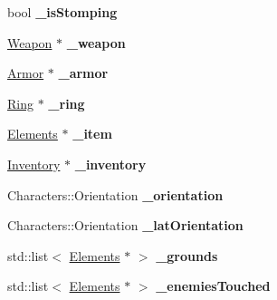 \begin{DoxyCompactItemize}
\item 
\hypertarget{class_characters_a96f1a899be7360999fea95c6d2e81db1}{bool {\bfseries \+\_\+is\+Stomping}}\label{class_characters_a96f1a899be7360999fea95c6d2e81db1}

\item 
\hypertarget{class_characters_aee5f545db9a5e0ee19af66dc0754b602}{\hyperlink{class_weapon}{Weapon} $\ast$ {\bfseries \+\_\+weapon}}\label{class_characters_aee5f545db9a5e0ee19af66dc0754b602}

\item 
\hypertarget{class_characters_a7a40cec6ae954c9b10bc30dcef299008}{\hyperlink{class_armor}{Armor} $\ast$ {\bfseries \+\_\+armor}}\label{class_characters_a7a40cec6ae954c9b10bc30dcef299008}

\item 
\hypertarget{class_characters_a711d1e46cc5e8405d425d62d55b17fee}{\hyperlink{class_ring}{Ring} $\ast$ {\bfseries \+\_\+ring}}\label{class_characters_a711d1e46cc5e8405d425d62d55b17fee}

\item 
\hypertarget{class_characters_a0befc3d5cf681d5cd555929ffde0d25a}{\hyperlink{class_elements}{Elements} $\ast$ {\bfseries \+\_\+item}}\label{class_characters_a0befc3d5cf681d5cd555929ffde0d25a}

\item 
\hypertarget{class_characters_acf5e32b47c1943fb72eb9de462e07437}{\hyperlink{class_inventory}{Inventory} $\ast$ {\bfseries \+\_\+inventory}}\label{class_characters_acf5e32b47c1943fb72eb9de462e07437}

\item 
\hypertarget{class_characters_ad1f8866efe25f7c8997a134f536fe121}{Characters\+::\+Orientation {\bfseries \+\_\+orientation}}\label{class_characters_ad1f8866efe25f7c8997a134f536fe121}

\item 
\hypertarget{class_characters_a1d78d9a93ebfad3f058a155505257c91}{Characters\+::\+Orientation {\bfseries \+\_\+lat\+Orientation}}\label{class_characters_a1d78d9a93ebfad3f058a155505257c91}

\item 
\hypertarget{class_characters_a35ee6e0ded905f63112a08cd3ad76435}{std\+::list$<$ \hyperlink{class_elements}{Elements} $\ast$ $>$ {\bfseries \+\_\+grounds}}\label{class_characters_a35ee6e0ded905f63112a08cd3ad76435}

\item 
\hypertarget{class_characters_a2ea33ac55f307d7ac1432f224fb1b4ed}{std\+::list$<$ \hyperlink{class_elements}{Elements} $\ast$ $>$ {\bfseries \+\_\+enemies\+Touched}}\label{class_characters_a2ea33ac55f307d7ac1432f224fb1b4ed}


\end{DoxyCompactItemize}
